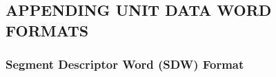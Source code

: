 
\subsection{APPENDING UNIT DATA WORD FORMATS}


\subsubsection{Segment Descriptor Word (SDW) Format}

